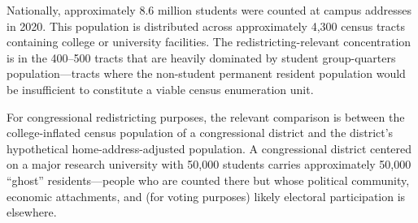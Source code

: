 Nationally, approximately 8.6 million students were counted at campus addresses in 2020. This population is distributed across approximately 4,300 census tracts containing college or university facilities. The redistricting-relevant concentration is in the 400--500 tracts that are heavily dominated by student group-quarters population---tracts where the non-student permanent resident population would be insufficient to constitute a viable census enumeration unit.

For congressional redistricting purposes, the relevant comparison is between the college-inflated census population of a congressional district and the district's hypothetical home-address-adjusted population. A congressional district centered on a major research university with 50,000 students carries approximately 50,000 ``ghost'' residents---people who are counted there but whose political community, economic attachments, and (for voting purposes) likely electoral participation is elsewhere.

